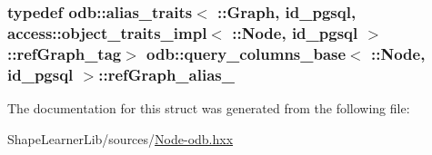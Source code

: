 \subsubsection[{ref\+Graph\+\_\+alias\+\_\+}]{\setlength{\rightskip}{0pt plus 5cm}typedef odb\+::alias\+\_\+traits$<$ \+::{\bf Graph}, id\+\_\+pgsql, access\+::object\+\_\+traits\+\_\+impl$<$ \+::{\bf Node}, id\+\_\+pgsql $>$\+::ref\+Graph\+\_\+tag$>$ odb\+::query\+\_\+columns\+\_\+base$<$ \+::{\bf Node}, id\+\_\+pgsql $>$\+::{\bf ref\+Graph\+\_\+alias\+\_\+}}\label{structodb_1_1query__columns__base_3_01_1_1_node_00_01id__pgsql_01_4_ab311bfd7c6def6fc3da77e3a2858ea38}


The documentation for this struct was generated from the following file\+:\begin{DoxyCompactItemize}
\item 
Shape\+Learner\+Lib/sources/\hyperlink{_node-odb_8hxx}{Node-\/odb.\+hxx}\end{DoxyCompactItemize}
